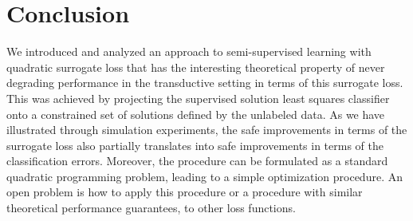 \documentclass{article}
\begin{document}
\section{Conclusion}
We introduced and analyzed an approach to semi-supervised learning with quadratic surrogate loss that has the interesting theoretical property of never degrading performance in the transductive setting in terms of this surrogate loss. This was achieved by projecting the supervised solution least squares classifier onto a constrained set of solutions defined by the unlabeled data. As we have illustrated through simulation experiments, the safe improvements in terms of the surrogate loss also partially translates into safe improvements in terms of the classification errors. Moreover, the procedure can be formulated as a standard quadratic programming problem, leading to a simple optimization procedure. An open problem is how to apply this procedure or a procedure with similar theoretical performance guarantees, to other loss functions.



\end{document}
